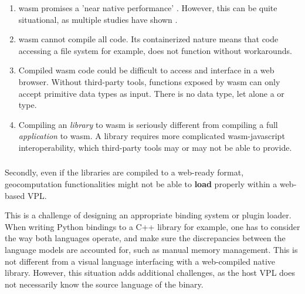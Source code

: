
\begin{enumerate}[-]
  \item \ac{wasm} promises a 'near native performance' \citep{haas_bringing_2017}. However, this can be quite situational, as multiple studies have shown \citep{jangda_not_2019, melch_performance_2019}. 
  \item \ac{wasm} cannot compile all code. Its containerized nature means that code accessing a file system for example, does not function without workarounds. 
  \item Compiled \ac{wasm} code could be difficult to access and interface in a web browser. Without third-party tools, functions exposed by \ac{wasm} can only accept primitive data types as input. There is no  data type, let alone a  or  type. 
  \item Compiling an \emph{library} to \ac{wasm} is seriously different from compiling a full \emph{application} to wasm. A library requires more complicated wasm-javascript interoperability, which third-party tools may or may not be able to provide.
\end{enumerate}

\subsubsection*{\mySubRQThreeTitle}

Secondly, even if the libraries are compiled to a web-ready format, geocomputation functionalities might not be able to \textbf{load} properly within a web-based VPL.

This is a challenge of designing an appropriate binding system or plugin loader. 
When writing Python bindings to a C++ library for example, one has to consider the way both languages operate, and make sure the discrepancies between the language models are accounted for, such as manual memory management. 
This is not different from a visual language interfacing with a web-compiled native library. 
However, this situation adds additional challenges, as the host \ac{VPL} does not necessarily know the source language of the binary. 


